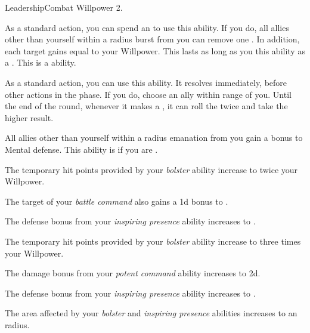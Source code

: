     \begin{feat}{Leadership}{Combat}
        \featpre Willpower 2.
        \featben

         As a standard action, you can spend an  to use this ability.
        If you do, all allies other than yourself within a \arealarge radius burst from you can remove one .
        In addition, each target gains  equal to your Willpower.
        This lasts as long as you  this ability as a .
        This is a  ability.

         As a standard action, you can use this ability.
        It resolves immediately, before other actions in the phase.
        If you do, choose an ally within \rngmed range of you.
        Until the end of the round, whenever it makes a , it can roll the  twice and take the higher result.

         All allies other than yourself within a \arealarge radius emanation from you gain a  bonus to Mental defense.
        This ability is  if you are .

         The temporary hit points provided by your \textit{bolster} ability increase to twice your Willpower.

         The target of your \textit{battle command} also gains a \plus1d bonus to .

         The defense bonus from your \textit{inspiring presence} ability increases to .

         The temporary hit points provided by your \textit{bolster} ability increase to three times your Willpower.

         The damage bonus from your \textit{potent command} ability increases to \plus2d.

         The defense bonus from your \textit{inspiring presence} ability increases to .

         The area affected by your \textit{bolster} and \textit{inspiring presence} abilities increases to an \areahuge radius.
    \end{feat}

